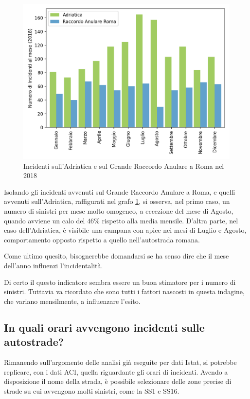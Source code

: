 \documentclass[a4paper,12pt]{report}
\begin{document}
\begin{figure}
    \hfill\includegraphics[width=0.7\linewidth]{../src/incidenti/incidenti_aci/autostrade/adriatica_roma.png}\hspace*{\fill}
    \caption{Incidenti sull'Adriatica e sul Grande Raccordo Anulare a Roma nel 2018}
    \label{fig:adriatica-roma}
\end{figure}

Isolando gli incidenti avvenuti sul Grande Raccordo Anulare a Roma, e quelli avvenuti 
sull'Adriatica, raffigurati nel grafo \ref{fig:adriatica-roma}, si osserva, 
nel primo caso, un numero di sinistri per mese molto omogeneo, a eccezione del 
mese di Agosto, quando avviene un calo del $46$\% rispetto alla media mensile. 
D'altra parte, nel caso dell'Adriatica, è visibile una campana con apice nei 
mesi di Luglio e Agosto, comportamento opposto rispetto a quello nell'autostrada 
romana.

Come ultimo quesito, bisognerebbe domandarsi se ha senso dire che il mese dell'anno 
influenzi l'incidentalità. 

Di certo il questo indicatore sembra essere un buon stimatore 
per i numero di sinistri.
Tuttavia va ricordato che sono tutti i fattori 
nascosti in questa indagine, che variano mensilmente, a influenzare l'esito. 

\subsection{In quali orari avvengono incidenti sulle autostrade?}

Rimanendo sull'argomento delle analisi già eseguite per dati Istat, 
si potrebbe replicare, con i dati ACI, quella riguardante gli orari di incidenti. 
Avendo a disposizione il nome della strada, è possibile selezionare delle zone precise 
di strade su cui avvengono molti sinistri, come la SS1 e SS16.
\end{document}
